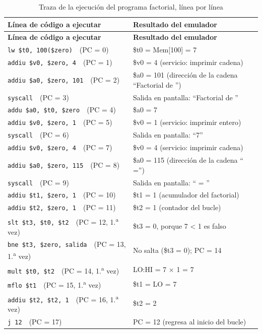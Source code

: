 \documentclass[11pt,letterpaper,oneside]{article}
\begin{document}
\begin{longtable}{@{}p{7.2cm} p{7.6cm}@{}}
\caption{Traza de la ejecución del programa factorial, línea por línea}\label{tab:traza}\\
\toprule
\textbf{Línea de código a ejecutar} & \textbf{Resultado del emulador}\\
\midrule
\endfirsthead
\toprule
\textbf{Línea de código a ejecutar} & \textbf{Resultado del emulador}\\
\midrule
\endhead
\texttt{lw \$t0, 100(\$zero)}\ \ (PC = 0) & \$t0 = Mem[100] = 7\\
\texttt{addiu \$v0, \$zero, 4}\ \ (PC = 1) & \$v0 = 4 (servicio: imprimir cadena)\\
\texttt{addiu \$a0, \$zero, 101}\ \ (PC = 2) & \$a0 = 101 (dirección de la cadena ``Factorial de '')\\
\texttt{syscall}\ \ (PC = 3) & Salida en pantalla: ``Factorial de ''\\
\texttt{addu \$a0, \$t0, \$zero}\ \ (PC = 4) & \$a0 = 7\\
\texttt{addiu \$v0, \$zero, 1}\ \ (PC = 5) & \$v0 = 1 (servicio: imprimir entero)\\
\texttt{syscall}\ \ (PC = 6) & Salida en pantalla: ``7''\\
\texttt{addiu \$v0, \$zero, 4}\ \ (PC = 7) & \$v0 = 4 (servicio: imprimir cadena)\\
\texttt{addiu \$a0, \$zero, 115}\ \ (PC = 8) & \$a0 = 115 (dirección de la cadena `` ='')\\
\texttt{syscall}\ \ (PC = 9) & Salida en pantalla: `` = ''\\
\texttt{addiu \$t1, \$zero, 1}\ \ (PC = 10) & \$t1 = 1 (acumulador del factorial)\\
\texttt{addiu \$t2, \$zero, 1}\ \ (PC = 11) & \$t2 = 1 (contador del bucle)\\
\texttt{slt \$t3, \$t0, \$t2}\ \ (PC = 12, 1.\textsuperscript{a} vez) & \$t3 = 0, porque 7 \textless{} 1 es falso\\
\texttt{bne \$t3, \$zero, salida}\ \ (PC = 13, 1.\textsuperscript{a} vez) & No salta (\$t3 = 0); PC = 14\\
\texttt{mult \$t0, \$t2}\ \ (PC = 14, 1.\textsuperscript{a} vez) & LO:HI = 7 × 1 = 7\\
\texttt{mflo \$t1}\ \ (PC = 15, 1.\textsuperscript{a} vez) & \$t1 = LO = 7\\
\texttt{addiu \$t2, \$t2, 1}\ \ (PC = 16, 1.\textsuperscript{a} vez) & \$t2 = 2\\
\texttt{j 12}\ \ (PC = 17) & PC = 12 (regresa al inicio del bucle)\\

\end{longtable}
\end{document}
